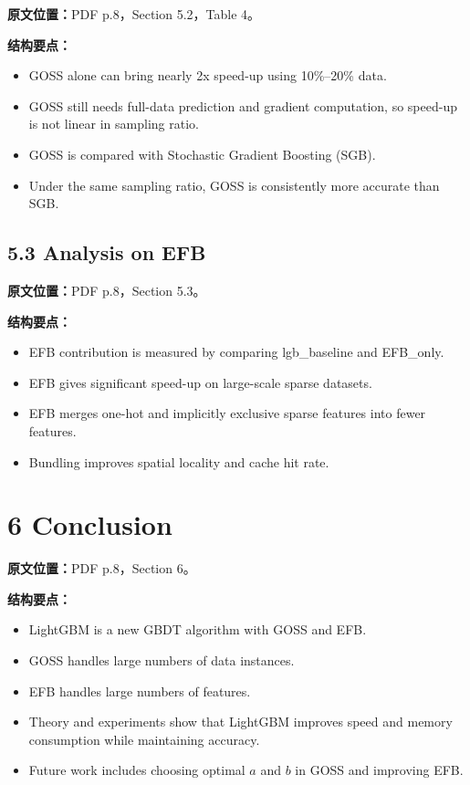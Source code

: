 \textbf{原文位置：}PDF p.8，Section 5.2，Table 4。

\textbf{结构要点：}
\begin{itemize}
  \item GOSS alone can bring nearly 2x speed-up using 10\%--20\% data.
  \item GOSS still needs full-data prediction and gradient computation, so speed-up is not linear in sampling ratio.
  \item GOSS is compared with Stochastic Gradient Boosting (SGB).
  \item Under the same sampling ratio, GOSS is consistently more accurate than SGB.
\end{itemize}

\subsection{5.3 Analysis on EFB}

\textbf{原文位置：}PDF p.8，Section 5.3。

\textbf{结构要点：}
\begin{itemize}
  \item EFB contribution is measured by comparing lgb\_baseline and EFB\_only.
  \item EFB gives significant speed-up on large-scale sparse datasets.
  \item EFB merges one-hot and implicitly exclusive sparse features into fewer features.
  \item Bundling improves spatial locality and cache hit rate.
\end{itemize}

\section{6 Conclusion}

\textbf{原文位置：}PDF p.8，Section 6。

\textbf{结构要点：}
\begin{itemize}
  \item LightGBM is a new GBDT algorithm with GOSS and EFB.
  \item GOSS handles large numbers of data instances.
  \item EFB handles large numbers of features.
  \item Theory and experiments show that LightGBM improves speed and memory consumption while maintaining accuracy.
  \item Future work includes choosing optimal $a$ and $b$ in GOSS and improving EFB.
\end{itemize}

